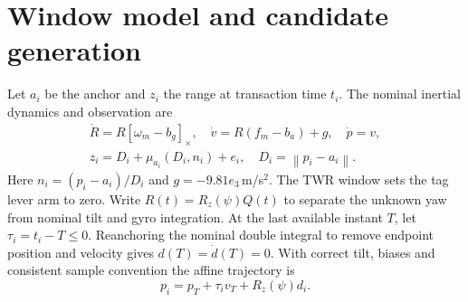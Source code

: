 \documentclass[conference,letterpaper,10pt]{IEEEtran}
\newcommand{\rz}{R_z}
\newcommand{\norm}[1]{\left\lVert#1\right\rVert}
\newcommand{\sk}[1]{[#1]_\times}
\begin{document}
\section{Window model and candidate generation}
Let $a_i$ be the anchor and $z_i$ the range at transaction time $t_i$. The nominal inertial dynamics and observation are
\begin{gather}
 \dot R=R\sk{\omega_m-b_g},\quad \dot v=R(f_m-b_a)+g,\quad \dot p=v,\label{eq:ins}\\
 z_i=D_i+\mu_{a_i}(D_i,n_i)+e_i,\quad D_i=\norm{p_i-a_i}.\label{eq:obs}
\end{gather}
Here $n_i=(p_i-a_i)/D_i$ and $g=-9.81e_3$\,m/s$^2$. The TWR window sets the tag lever arm to zero. Write $R(t)=\rz(\psi)Q(t)$ to separate the unknown yaw from nominal tilt and gyro integration. At the last available instant $T$, let $\tau_i=t_i-T\le0$. Reanchoring the nominal double integral to remove endpoint position and velocity gives $d(T)=\dot d(T)=0$. With correct tilt, biases and consistent sample convention the affine trajectory is
\begin{equation}
 p_i=p_T+\tau_i v_T+\rz(\psi)d_i.                    \label{eq:affine}
\end{equation}
\end{document}
